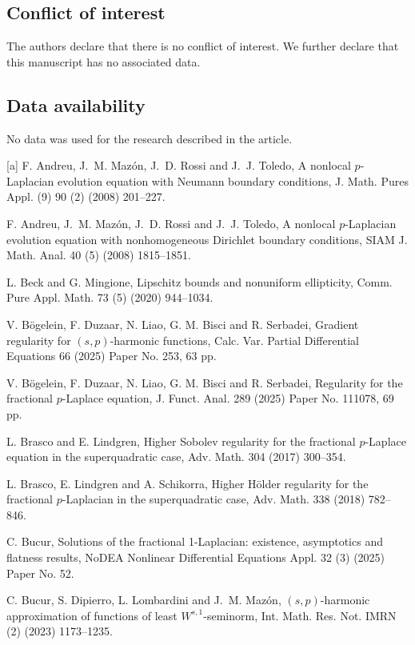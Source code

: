 \documentclass[reqno,10pt]{amsart}
\numberwithin{equation}{section}
\begin{document}
\subsection*{Conflict of interest} The authors declare that there is no conflict of interest. We further declare that this manuscript has no associated data.
	
\subsection*{Data availability}
No data was used for the research described in the article.
	


	
\begin{thebibliography}{[a]}
 F. Andreu, J.~M. Maz\'on, J.~D. Rossi and J.~J. Toledo, A nonlocal $p$-Laplacian evolution equation with Neumann boundary conditions, J. Math. Pures Appl. (9) 90 (2) (2008) 201--227.
		
 F. Andreu, J.~M. Maz\'on, J.~D. Rossi and J.~J. Toledo, A nonlocal $p$-Laplacian evolution equation with nonhomogeneous Dirichlet boundary conditions, SIAM J. Math. Anal. 40 (5) (2008) 1815--1851.

 L. Beck and G. Mingione, Lipschitz bounds and nonuniform ellipticity, Comm. Pure Appl. Math. 73 (5) (2020) 944--1034.
		
 V. B\"{o}gelein, F. Duzaar, N. Liao, G. M. Bisci and R. Serbadei, Gradient regularity for $(s, p)$-harmonic functions, Calc. Var. Partial Differential Equations 66 (2025) Paper No. 253, 63 pp.
		
 V. B\"{o}gelein, F. Duzaar, N. Liao, G. M. Bisci and R. Serbadei, Regularity for the fractional $p$-Laplace equation, J. Funct. Anal. 289 (2025) Paper No. 111078, 69 pp.
		
 L. Brasco and E. Lindgren, Higher Sobolev regularity for the fractional $p$-Laplace equation in the superquadratic case, Adv. Math. 304 (2017) 300--354.
		
 L. Brasco, E. Lindgren and A. Schikorra, Higher H\"older regularity for the fractional $p$-Laplacian in the superquadratic case, Adv. Math. 338 (2018) 782--846.
		
		 C. Bucur, Solutions of the fractional 1-Laplacian: existence, asymptotics and flatness results, NoDEA Nonlinear Differential Equations Appl. 32 (3) (2025) Paper No. 52.
		
		 C. Bucur, S. Dipierro, L. Lombardini and J.~M. Maz\'on, $(s, p)$-harmonic approximation of functions of least $W^{s,1}$-seminorm, Int. Math. Res. Not. IMRN (2) (2023) 1173--1235.
		

\end{thebibliography}
\end{document}
